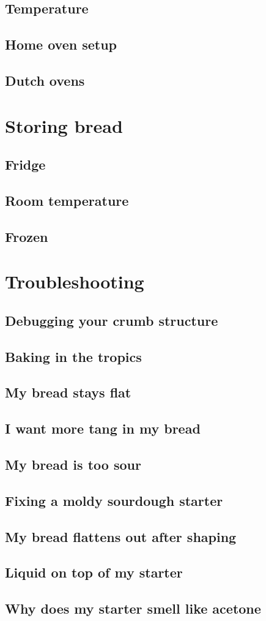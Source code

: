 \documentclass[a4paper, 12pt]{book}
\begin{document}
\section{Temperature}
\section{Home oven setup}
\section{Dutch ovens}

\chapter{Storing bread}
\section{Fridge}
\section{Room temperature}
\section{Frozen}

\chapter{Troubleshooting}
\section{Debugging your crumb structure}
\section{Baking in the tropics}
\section{My bread stays flat}
\section{I want more tang in my bread}
\section{My bread is too sour}
\section{Fixing a moldy sourdough starter}
\section{My bread flattens out after shaping}
\section{Liquid on top of my starter}
\section{Why does my starter smell like acetone}
\end{document}
